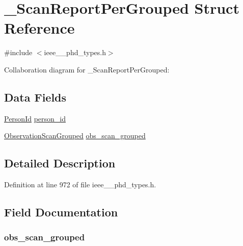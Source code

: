 \hypertarget{struct___scan_report_per_grouped}{}\section{\+\_\+\+Scan\+Report\+Per\+Grouped Struct Reference}
\label{struct___scan_report_per_grouped}


{\ttfamily \#include $<$ieee\+\_\+\_\+phd\+\_\+types.\+h$>$}



Collaboration diagram for \+\_\+\+Scan\+Report\+Per\+Grouped\+:
\subsection*{Data Fields}
\begin{DoxyCompactItemize}
\item 
\hyperlink{ieee__11073__phd__types_8h_adf76595850f652b6ddf1c391a03c8bf8}{Person\+Id} \hyperlink{struct___scan_report_per_grouped_a220a46bb779d76e54fe1dd1a26f2d635}{person\+\_\+id}
\item 
\hyperlink{ieee__11073__phd__types_8h_a4cdea7a5ef6dd39de2bcc4f8d72e166a}{Observation\+Scan\+Grouped} \hyperlink{struct___scan_report_per_grouped_ad7edbcb4e4a7ba5f5b51f00a6cff2741}{obs\+\_\+scan\+\_\+grouped}
\end{DoxyCompactItemize}


\subsection{Detailed Description}


Definition at line 972 of file ieee\+\_\+\_\+phd\+\_\+types.\+h.



\subsection{Field Documentation}
\hypertarget{struct___scan_report_per_grouped_ad7edbcb4e4a7ba5f5b51f00a6cff2741}{}
\subsubsection[{obs\+\_\+scan\+\_\+grouped}]{ obs\+\_\+scan\+\_\+grouped}\label{struct___scan_report_per_grouped_ad7edbcb4e4a7ba5f5b51f00a6cff2741}


